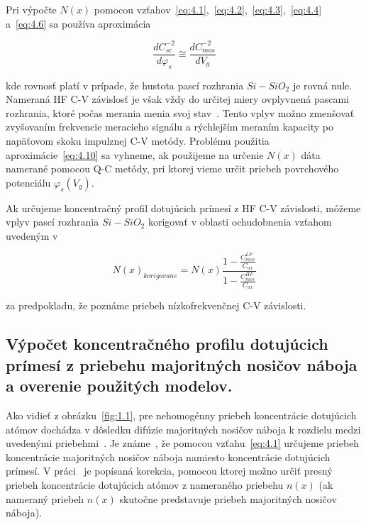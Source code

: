 \par Pri výpočte $N(x)$ pomocou
vzťahov~\ref{eq:4.1},~\ref{eq:4.2},~\ref{eq:4.3},~\ref{eq:4.4}
a~\ref{eq:4.6} sa používa aproximácia

\begin{equation}\label{eq:4.10}
  \frac{dC_{sc}^{-2}}{d\varphi_{s}} \cong \frac{dC_{mos}^{-2}}{dV_{g}}
\end{equation}

kde rovnosť platí v prípade, že hustota pascí rozhrania $Si-SiO_{2}$
je rovná nule. Nameraná HF C-V závislosť je však vždy do určitej miery
ovplyvnená pascami rozhrania, ktoré počas merania menia svoj
stav~\cite{4.15}. Tento vplyv možno zmenšovať zvyšovaním frekvencie
meracieho signálu a rýchlejším meraním kapacity po napäťovom skoku
impulznej C-V metódy.  Problému použitia aproximácie~\ref{eq:4.10} sa
vyhneme, ak použijeme na určenie $N(x)$ dáta namerané pomocou Q-C
metódy, pri ktorej vieme určit priebeh povrchového potenciálu
$\varphi_{s}(V_{g})$.

\par Ak určujeme koncentračný profil dotujúcich prímesí z HF C-V
závislosti, môžeme vplyv pascí rozhrania $Si-SiO_{2}$ korigovať v
oblasti ochudobnenia vzťahom uvedeným v~\cite{I.1}

\begin{equation}\label{eq:4.11}
  {N(x)}_{korigovane} = {N(x)}{\frac{1-\frac{C_{mos}^{LF}}{C_{ox}}}{1-\frac{C_{mos}^{HF}}{C_{ox}}}}
\end{equation}

za predpokladu, že poznáme priebeh nízkofrekvenčnej C-V závislosti.


\subsection[Výpočet koncentračného profilu dotujúcich prímesí z priebehu majoritných nosičov náboja a overenie použitých modelov.]{Výpočet koncentračného profilu dotujúcich prímesí z priebehu majoritných nosičov náboja a overenie použitých modelov.}\label{sec:4.1.4}

Ako vidieť z obrázku~\ref{fig:1.1}, pre nehomogénny priebeh
koncentrácie dotujúcich atómov dochádza v dôsledku difúzie majoritných
nosičov náboja k rozdielu medzi uvedenými priebehmi~\cite{4.16}. Je
známe~\cite{4.17}, že pomocou vzťahu~\ref{eq:4.1} určujeme priebeh
koncentrácie majoritných nosičov náboja namiesto koncentrácie
dotujúcich prímesí. V práci~\cite{4.18} je popísaná korekcia, pomocou
ktorej možno určiť presný priebeh koncentrácie dotujúcich atómov z
nameraného priebehu $n(x)$ (ak nameraný priebeh $n(x)$ skutočne
predstavuje priebeh majoritných nosičov náboja).

